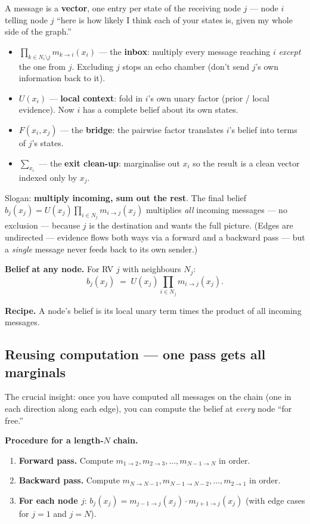 \documentclass[11pt, a4paper]{article}
\begin{document}
\begin{notebox}
A message is a \textbf{vector}, one entry per state of the receiving node $j$ — node $i$ telling
node $j$ ``here is how likely I think each of your states is, given my whole side of the graph.''
\begin{itemize}
  \item $\prod_{k\in N_i\setminus j} m_{k\to i}(x_i)$ — the \textbf{inbox}: multiply every message
  reaching $i$ \emph{except} the one from $j$. Excluding $j$ stops an echo chamber (don't send $j$'s
  own information back to it).
  \item $U(x_i)$ — \textbf{local context}: fold in $i$'s own unary factor (prior / local evidence).
  Now $i$ has a complete belief about its own states.
  \item $F(x_i,x_j)$ — the \textbf{bridge}: the pairwise factor translates $i$'s belief into terms of
  $j$'s states.
  \item $\sum_{x_i}$ — the \textbf{exit clean-up}: marginalise out $x_i$ so the result is a clean
  vector indexed only by $x_j$.
\end{itemize}
Slogan: \textbf{multiply incoming, sum out the rest}. The final belief $b_j(x_j)=U(x_j)\prod_{i\in N_j}m_{i\to j}(x_j)$
multiplies \emph{all} incoming messages — no exclusion — because $j$ is the destination and wants the
full picture. (Edges are undirected — evidence flows both ways via a forward and a backward pass —
but a \emph{single} message never feeds back to its own sender.)
\end{notebox}

\textbf{Belief at any node.} For RV $j$ with neighbours $N_j$:
\[
\boxed{\;b_j(x_j) \;=\; U(x_j)\prod_{i\in N_j} m_{i\to j}(x_j).\;}
\]

\textbf{Recipe.} A node's belief is its local unary term times the product of all incoming messages.

\subsection{Reusing computation --- one pass gets all marginals}

The crucial insight: once you have computed all messages on the chain (one in each direction along each edge), you can compute the belief at \emph{every} node ``for free.''

\textbf{Procedure for a length-$N$ chain.}
\begin{enumerate}
  \item \textbf{Forward pass.} Compute $m_{1\to 2}, m_{2\to 3}, \ldots, m_{N-1\to N}$ in order.
  \item \textbf{Backward pass.} Compute $m_{N\to N-1}, m_{N-1\to N-2}, \ldots, m_{2\to 1}$ in order.
  \item \textbf{For each node $j$}: $b_j(x_j) = m_{j-1\to j}(x_j) \cdot m_{j+1\to j}(x_j)$ (with edge cases for $j=1$ and $j=N$).
\end{enumerate}
\end{document}
